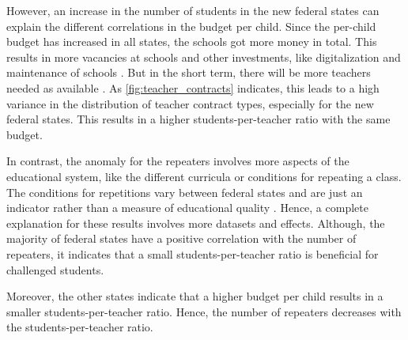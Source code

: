 However,  an increase in the number of students in the new federal states can explain the different correlations in the budget per child. Since the per-child budget has increased in all states, the schools got more money in total. This results in more vacancies at schools \cite{kultusminister_konferenz_lehrkrafteeinstellungsbedarf_2023} and other investments, like digitalization and maintenance of schools \cite{bundesministerium_fur_bildung_und_forschung_fortschrittsbericht_2022}. But in the short term, there will be more teachers needed as available \cite{kultusminister_konferenz_lehrkrafteeinstellungsbedarf_2023}. As \autoref{fig:teacher_contracts} indicates, this leads to a high variance in the distribution of teacher contract types, especially for the new federal states. This results in a higher students-per-teacher ratio with the same budget.

In contrast, the anomaly for the repeaters involves more aspects of the educational system, like the different curricula or conditions for repeating a class. The conditions for repetitions vary between federal states and are just an indicator rather than a measure of educational quality \cite{klemm_klassenwiederholungen_2009}. Hence, a complete explanation for these results involves more datasets and effects. Although, the majority of federal states have a positive correlation with the number of repeaters, it indicates that a small students-per-teacher ratio is beneficial for challenged students.

Moreover, the other states indicate that a higher budget per child results in a smaller students-per-teacher ratio. Hence, the number of repeaters decreases with the students-per-teacher ratio.